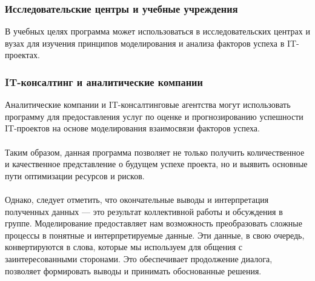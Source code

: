 \documentclass{article}
\begin{document}
    \subsubsection{Исследовательские центры и учебные учреждения}
    В учебных целях программа может использоваться в исследовательских центрах и вузах для изучения принципов моделирования и анализа факторов успеха в IT-проектах.
    \subsubsection{IT-консалтинг и аналитические компании}
    Аналитические компании и IT-консалтинговые агентства могут использовать программу для предоставления услуг по оценке и прогнозированию успешности IT-проектов на основе моделирования взаимосвязи факторов успеха.\\
    ~\\
    Таким образом, данная программа позволяет не только получить количественное и качественное представление о будущем успехе проекта, но и выявить основные пути оптимизации ресурсов и рисков.\\
    ~\\
    Однако, следует отметить, что окончательные выводы и интерпретация полученных данных — это результат коллективной работы и обсуждения в группе. Моделирование предоставляет нам возможность преобразовать сложные процессы в понятные и интерпретируемые данные. Эти данные, в свою очередь, конвертируются в слова, которые мы используем для общения с заинтересованными сторонами. Это обеспечивает продолжение диалога, позволяет формировать выводы и принимать обоснованные решения.\\
\end{document}
